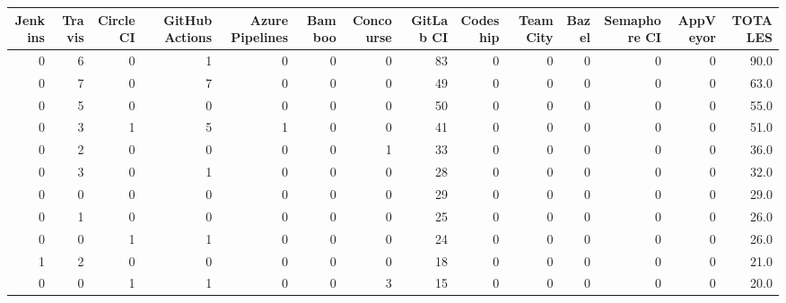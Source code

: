 \begin{tabular}{rrrrrrrrrrrrrr}
\toprule
 Jenkins &  Travis &  Circle CI &  GitHub Actions &  Azure Pipelines &  Bamboo &  Concourse &  GitLab CI &  Codeship &  TeamCity &  Bazel &  Semaphore CI &  AppVeyor &  TOTALES \\
\midrule
       0 &       6 &          0 &               1 &                0 &       0 &          0 &         83 &         0 &         0 &      0 &             0 &         0 &     90.0 \\
       0 &       7 &          0 &               7 &                0 &       0 &          0 &         49 &         0 &         0 &      0 &             0 &         0 &     63.0 \\
       0 &       5 &          0 &               0 &                0 &       0 &          0 &         50 &         0 &         0 &      0 &             0 &         0 &     55.0 \\
       0 &       3 &          1 &               5 &                1 &       0 &          0 &         41 &         0 &         0 &      0 &             0 &         0 &     51.0 \\
       0 &       2 &          0 &               0 &                0 &       0 &          1 &         33 &         0 &         0 &      0 &             0 &         0 &     36.0 \\
       0 &       3 &          0 &               1 &                0 &       0 &          0 &         28 &         0 &         0 &      0 &             0 &         0 &     32.0 \\
       0 &       0 &          0 &               0 &                0 &       0 &          0 &         29 &         0 &         0 &      0 &             0 &         0 &     29.0 \\
       0 &       1 &          0 &               0 &                0 &       0 &          0 &         25 &         0 &         0 &      0 &             0 &         0 &     26.0 \\
       0 &       0 &          1 &               1 &                0 &       0 &          0 &         24 &         0 &         0 &      0 &             0 &         0 &     26.0 \\
       1 &       2 &          0 &               0 &                0 &       0 &          0 &         18 &         0 &         0 &      0 &             0 &         0 &     21.0 \\
       0 &       0 &          1 &               1 &                0 &       0 &          3 &         15 &         0 &         0 &      0 &             0 &         0 &     20.0 \\

\end{tabular}
